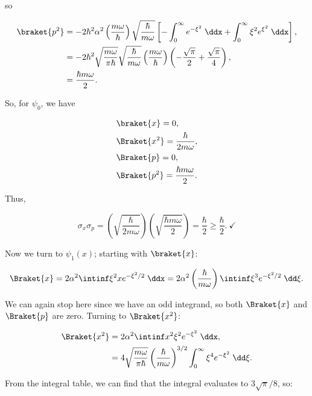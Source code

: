 \begin{parts}
so

\begin{align*}
    \braket{p^2} &= -2\hbar^2\alpha^2 \left( \frac{m\omega}{\hbar} \right) \sqrt{\frac{\hbar}{m\omega}} \left[ -\int_0^{\infty} e^{-\xi^2}\;\ddx + \int_0^{\infty} \xi^2 e^{\xi^2} \;\ddx \right], \\
    &= -2\hbar^2  \sqrt{\frac{m\omega}{\pi\hbar}} \sqrt{\frac{\hbar}{m\omega}} \left( \frac{m\omega}{\hbar} \right) \left( -\frac{\sqrt{\pi}}{2} + \frac{\sqrt{\pi}}{4}\right), \\
    &= \frac{\hbar m\omega}{2}.
\end{align*}


So, for $\psi_0$, we have 

\begin{align*}
    &\braket{x} = 0, \\
    &\Braket{x^2} = \frac{\hbar}{2m\omega}, \\
    &\Braket{p} = 0, \\
    &\Braket{p^2} = \frac{\hbar m\omega}{2}.
\end{align*}

Thus,

\begin{equation*}
    \sigma_x\sigma_p = \left( \sqrt{\frac{\hbar}{2m\omega}} \right)\left( \sqrt{\frac{\hbar m\omega}{2}} \right) = \frac{\hbar}{2} \geq \frac{\hbar}{2}. \ \checkmark
\end{equation*}

Now we turn to $\psi_1(x)$; starting with $\braket{x}$:

\begin{equation*}
    \Braket{x} = 2\alpha^2 \intinf \xi^2 x e^{-\xi^2/2}\;\ddx = 2\alpha^2 \left( \frac{\hbar}{m\omega} \right) \intinf \xi^3 e^{-\xi^2/2} \;\dd\xi.
\end{equation*}

We can again stop here since we have an odd integrand, so both $\Braket{x}$ and $\Braket{p}$ are zero. Turning to $\Braket{x^2}$:

\begin{align*}
    \Braket{x^2} &= 2\alpha^2 \intinf x^2\xi^2 e^{-\xi^2}\;\ddx, \\
    &= 4 \sqrt{\frac{m\omega}{\pi\hbar}}\left( \frac{\hbar}{m\omega} \right)^{3/2} \int_0^{\infty} \xi^4 e^{-\xi^2} \;\dd\xi.
\end{align*}

From the integral table, we can find that the integral evaluates to $3\sqrt{\pi}/8$, so:


\end{parts}
